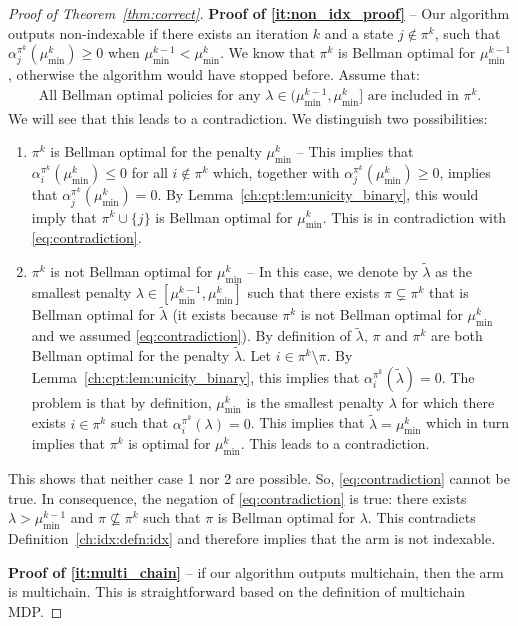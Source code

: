 \begin{proof}[Proof of Theorem~\ref{thm:correct}]
    \textbf{Proof of \ref{it:non_idx_proof}} -- 
    Our algorithm outputs non-indexable if there exists an iteration $k$ and a state $j\notin\pi^k$, such that $\alpha^{\pi^k}_j(\mu^k_{\min})\ge0$ when $\mu^{k-1}_{\min}<\mu^k_{\min}$.
    We know that $\pi^k$ is Bellman optimal for $\mu^{k-1}_{\min}$, otherwise the algorithm would have stopped before.
    Assume that:
    \begin{align}
        \label{eq:contradiction}
        \text{All Bellman optimal policies for any $\lambda\in(\mu^{k-1}_{\min},\mu^k_{\min}]$ are included in $\pi^k$.}
    \end{align}
    We will see that this leads to a contradiction. We distinguish two possibilities: 
    \begin{enumerate}
        \item $\pi^k$ is Bellman optimal for the penalty $\mu^k_{\min}$ -- This implies that $\alpha^{\pi^k}_i(\mu^k_{\min})\le0$ for all $i\not\in\pi^k$ which, together with $\alpha^{\pi^k}_j(\mu^k_{\min})\ge0$, implies that $\alpha^{\pi^k}_j(\mu^k_{\min})=0$.
            By Lemma~\ref{ch:cpt:lem:unicity_binary}, this would imply that $\pi^k\cup\{j\}$ is Bellman optimal for $\mu^k_{\min}$.
            This is in contradiction with \eqref{eq:contradiction}.
        \item $\pi^k$ is not Bellman optimal for $\mu^k_{\min}$ -- In this case, we denote by $\tilde{\lambda}$ as the smallest penalty $\lambda\in[\mu^{k-1}_{\min},\mu^{k}_{\min}]$ such that there exists $\pi\subsetneq\pi^k$ that is Bellman optimal for $\tilde{\lambda}$ (it exists because $\pi^k$ is not Bellman optimal for $\mu^k_{\min}$ and we assumed \eqref{eq:contradiction}).
            By definition of $\tilde{\lambda}$, $\pi$ and $\pi^k$ are both Bellman optimal for the penalty $\tilde{\lambda}$.
            Let $i\in\pi^k\setminus\pi$.
            By Lemma~\ref{ch:cpt:lem:unicity_binary}, this implies that $\alpha^{\pi^k}_i(\tilde{\lambda})=0$.
            The problem is that by definition, $\mu^k_{\min}$ is the smallest penalty $\lambda$ for which there exists $i\in\pi^k$ such that $\alpha^{\pi^k}_i(\lambda)=0$.
            This implies that $\tilde{\lambda}=\mu^k_{\min}$ which in turn implies that $\pi^k$ is optimal for $\mu^k_{\min}$.
            This leads to a contradiction.
    \end{enumerate}
    This shows that neither case 1 nor 2 are possible. So, \eqref{eq:contradiction} cannot be true.
    In consequence, the negation of \eqref{eq:contradiction} is true: there exists $\lambda>\mu^{k-1}_{\min}$ and $\pi\not\subseteq \pi^k$ such that $\pi$ is Bellman optimal for $\lambda$.
    This contradicts Definition~\ref{ch:idx:defn:idx} and therefore implies that the arm is not indexable. 

    \medskip
    \textbf{Proof of \ref{it:multi_chain}} -- if our algorithm outputs multichain, then the arm is multichain.
    This is straightforward based on the definition of multichain MDP.
\end{proof}

